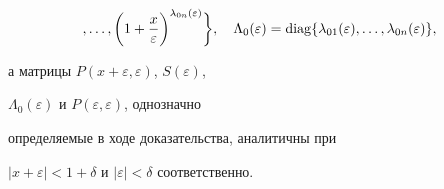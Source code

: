 \begin{thm}
\begin{gather*}
,\dotsc,\bigg(1+\frac{x}{\varepsilon} 


\bigg)^{\lambda_{0n}(\varepsilon)}\bigg\},\quad 


\Lambda_0(\varepsilon)=\diag\{\lambda_{01}(\varepsilon),\dotsc, 


\lambda_{0n}(\varepsilon)\}, 


\end{gather*} 


а матрицы $P(x+\varepsilon,\varepsilon)$, $S(\varepsilon)$, 


$\Lambda_0(\varepsilon)$ и $P(\varepsilon,\varepsilon)$, однозначно 


определяемые в ходе доказательства, аналитичны при 


$|x+\varepsilon|<1+\delta$ и $|\varepsilon|<\delta$ соответственно. 


\end{thm} 


 


